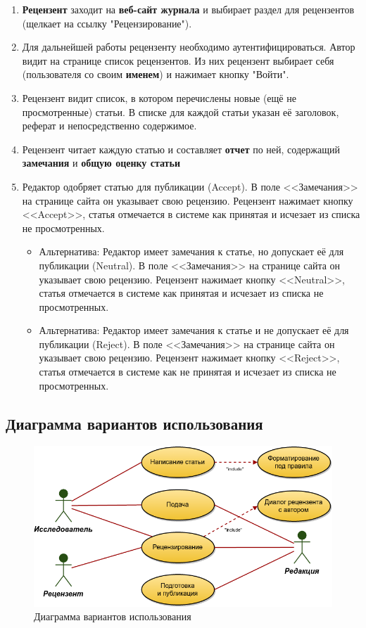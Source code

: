 \begin{enumerate}
\item \textbf{Рецензент} заходит на \textbf{веб-сайт журнала} и выбирает раздел для рецензентов (щелкает на ссылку "Рецензирование").
\item Для дальнейшей работы рецензенту необходимо аутентифицироваться. Автор видит на странице список рецензентов. Из них рецензент выбирает себя (пользователя со своим \textbf{именем}) и нажимает кнопку "Войти".
\item Рецензент видит список, в котором перечислены новые (ещё не просмотренные) статьи. В списке для каждой статьи указан её заголовок, реферат и непосредственно содержимое.
\item
  Рецензент читает каждую статью и составляет \textbf{отчет} по ней,
  содержащий \textbf{замечания} и \textbf{общую оценку статьи}
\item
  Редактор одобряет статью для публикации (Accept). В поле <<Замечания>> на странице сайта он указывает свою рецензию. Рецензент нажимает кнопку <<Accept>>, статья отмечается в системе как принятая и исчезает из списка не просмотренных.
  
  \begin{itemize}
  \item
    Альтернатива: Редактор имеет замечания к статье, но допускает её для публикации (Neutral). В поле <<Замечания>> на странице сайта он указывает свою рецензию. Рецензент нажимает кнопку <<Neutral>>, статья отмечается в системе как принятая и исчезает из списка не просмотренных.
  \item
    Альтернатива: Редактор имеет замечания к статье и не допускает её для публикации (Reject). В поле <<Замечания>> на странице сайта он указывает свою рецензию. Рецензент нажимает кнопку <<Reject>>, статья отмечается в системе как не принятая и исчезает из списка не просмотренных.
  \end{itemize}
\end{enumerate}

\subsection{Диаграмма вариантов использования}

\begin{figure}[H]
\centering
\includegraphics[width=\textwidth]{../UseCases.png}
\caption{Диаграмма вариантов использования}
\end{figure}

